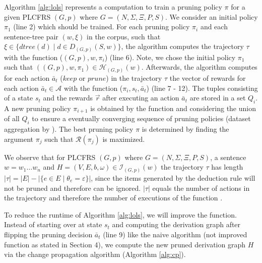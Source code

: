 \documentclass{tudscrartcl}
\theoremstyle{definition}
\begin{document}
Algorithm \ref{alg:lols} represents a computation to train a pruning policy $\pi$ for a given PLCFRS $(G, p)$ where $G = (N, \Sigma, \Xi, P, S)$.
We consider an initial policy $\pi_1$ (line 2) which should be trained.
For each pruning policy $\pi_i$ and each sentence-tree pair $(w, \xi)$ in the corpus, such that $\xi \in \{dtree(d)\mid d \in D_{(G, p)}(S, w)\}$, the algorithm computes the trajectory $\tau$ with the function ($(G, p), w, \pi_i$) (line 6).
Note, we chose the initial policy $\pi_1$ such that $((G, p), w, \pi_1) \in \mathcal{H}_{(G, p)}(w)$.
Afterwards, the algorithm computes for each action $\bar{a}_t$ ($keep$ or $prune$) in the trajectory $\tau$ the vector of rewards for each action $\bar{a}_t \in \mathcal{A}$ with the function ($\pi_i, s_t, \bar{a}_t$) (line 7 - 12).
The tuples consisting of a state $s_t$ and the rewards $\vec{r}$ after executing an action $\bar{a}_t$ are stored in a set $Q_i$.
A new pruning policy $\pi_{i+1}$ is obtained by the function  and considering the union of all $Q_i$ to ensure a eventually converging sequence of pruning policies (dataset aggregation by \cite{ross10}).
The best pruning policy $\pi$ is determined by finding the argument $\pi_j$ such that $\mathcal{R}(\pi_j)$ is maximized.

We observe that for PLCFRS $(G, p)$ where $G = (N, \Sigma, \Xi, P, S)$, a sentence $w = w_1 \ldots w_n$ and $H = (V, E, b, \omega) \in \mathcal{I}_{(G,p)}(w)$ the trajectory $\tau$ has length $|\tau| = |E| - |\{e \in E \mid \theta_e = \varepsilon\}|$, since the items generated by the  deduction rule will not be pruned and therefore can be ignored. 
$|\tau|$ equals the number of actions in the trajectory and therefore the number of executions of the function .

To reduce the runtime of Algorithm \ref{alg:lols}, we will improve the  function. Instead of starting over at state $s_t$ and computing the derivation graph after flipping the pruning decision $\bar{a}_t$ (line 9) like the naive  algorithm (not improved function as stated in Section 4), we compute the new pruned derivation graph $H$ via the change propagation algorithm (Algorithm \ref{alg:cp}).


\end{document}
